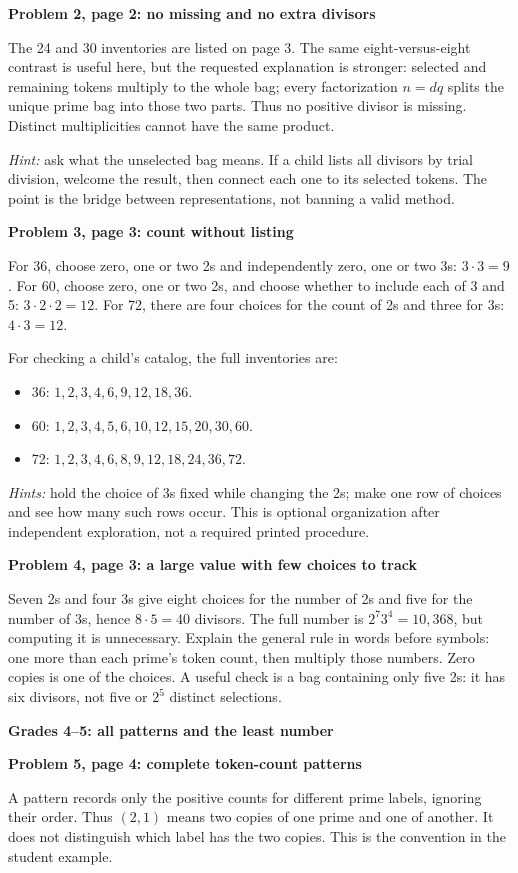 \documentclass[11pt]{article}
\newcommand{\head}[1]{\par\textbf{\large #1}\par}
\newcommand{\sub}[1]{\par\textbf{#1}\par}
\begin{document}
\sub{Problem 2, page 2: no missing and no extra divisors}
The 24 and 30 inventories are listed on page 3. The same eight-versus-eight contrast is useful here, but the requested explanation is stronger: selected and remaining tokens multiply to the whole bag; every factorization $n=dq$ splits the unique prime bag into those two parts. Thus no positive divisor is missing. Distinct multiplicities cannot have the same product.

\emph{Hint:} ask what the unselected bag means. If a child lists all divisors by trial division, welcome the result, then connect each one to its selected tokens. The point is the bridge between representations, not banning a valid method.

\sub{Problem 3, page 3: count without listing}
For 36, choose zero, one or two 2s and independently zero, one or two 3s: $3\cdot3=9$. For 60, choose zero, one or two 2s, and choose whether to include each of 3 and 5: $3\cdot2\cdot2=12$. For 72, there are four choices for the count of 2s and three for 3s: $4\cdot3=12$.

For checking a child's catalog, the full inventories are:
\begin{itemize}
\item 36: $1,2,3,4,6,9,12,18,36$.
\item 60: $1,2,3,4,5,6,10,12,15,20,30,60$.
\item 72: $1,2,3,4,6,8,9,12,18,24,36,72$.
\end{itemize}
\emph{Hints:} hold the choice of 3s fixed while changing the 2s; make one row of choices and see how many such rows occur. This is optional organization after independent exploration, not a required printed procedure.

\sub{Problem 4, page 3: a large value with few choices to track}
Seven 2s and four 3s give eight choices for the number of 2s and five for the number of 3s, hence $8\cdot5=40$ divisors. The full number is $2^7 3^4=10{,}368$, but computing it is unnecessary. Explain the general rule in words before symbols: one more than each prime's token count, then multiply those numbers. Zero copies is one of the choices. A useful check is a bag containing only five 2s: it has six divisors, not five or $2^5$ distinct selections.
\newpage
\head{Grades 4--5: all patterns and the least number}
\sub{Problem 5, page 4: complete token-count patterns}
A pattern records only the positive counts for different prime labels, ignoring their order. Thus $(2,1)$ means two copies of one prime and one of another. It does not distinguish which label has the two copies. This is the convention in the student example.
\end{document}
